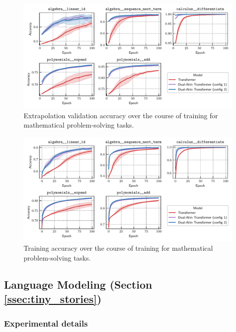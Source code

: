 \begin{figure}
    \centering
    \includegraphics[width=\textwidth]{figs/experiments/math/math_training_curves_extrapolation.pdf}
    \caption{Extrapolation validation accuracy over the course of training for mathematical problem-solving tasks.}\label{fig:math_training_curves_extrapolation}
\end{figure}

\begin{figure}
    \centering
    \includegraphics[width=\textwidth]{figs/experiments/math/math_training_curves_trainacc.pdf}
    \caption{Training accuracy over the course of training for mathematical problem-solving tasks.}\label{fig:math_training_curves_trainacc}
\end{figure}


\subsection{Language Modeling (Section \ref{ssec:tiny_stories})}\label{ssec:appendix_lm}

\subsubsection*{Experimental details}

